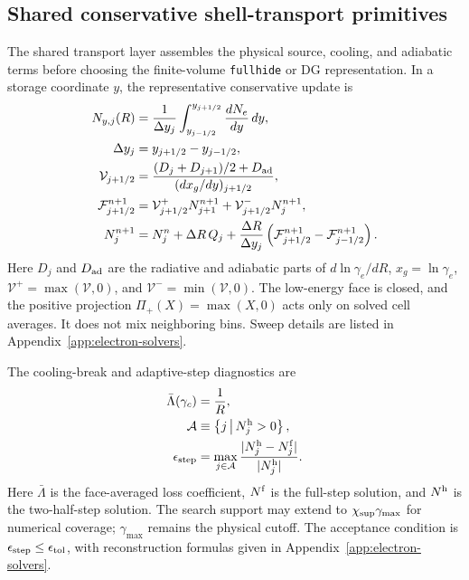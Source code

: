 \documentclass[twocolumn]{aastex702}
\begin{document}
\subsection{Shared conservative shell-transport primitives}

The shared transport layer assembles the physical source, cooling, and adiabatic
terms before choosing the finite-volume \texttt{fullhide} or DG representation.
In a storage coordinate \(y\), the representative conservative update is
\begin{equation}
\begin{aligned}
N_{y,j}(R)&=\frac{1}{\Delta y_j}
\int_{y_{j-1/2}}^{y_{j+1/2}}\frac{dN_e}{dy}\,dy,\\
\Delta y_j&=y_{j+1/2}-y_{j-1/2},\\
\mathcal{V}_{j+1/2}&=
\frac{(D_j+D_{j+1})/2+D_{\rm ad}}
{(dx_g/dy)_{j+1/2}},\\
\mathcal{F}_{j+1/2}^{n+1}&
=\mathcal{V}_{j+1/2}^{+}N_{j+1}^{n+1}
+\mathcal{V}_{j+1/2}^{-}N_j^{n+1},\\
N_j^{n+1}&=N_j^n+\Delta R\,Q_j
+\frac{\Delta R}{\Delta y_j}
\left(\mathcal{F}_{j+1/2}^{n+1}
-\mathcal{F}_{j-1/2}^{n+1}\right).
\end{aligned}
\end{equation}
Here \(D_j\) and \(D_{\rm ad}\) are the radiative and adiabatic parts of
\(d\ln\gamma_e/dR\), \(x_g=\ln\gamma_e\),
\(\mathcal{V}^{+}=\max(\mathcal{V},0)\), and
\(\mathcal{V}^{-}=\min(\mathcal{V},0)\).  The low-energy face is closed, and the
positive projection \(\Pi_+(X)=\max(X,0)\) acts only on solved cell averages.  It
does not mix neighboring bins.  Sweep details are listed in
Appendix~\ref{app:electron-solvers}.

The cooling-break and adaptive-step diagnostics are
\begin{equation}
\begin{aligned}
\bar{\Lambda}(\gamma_c)&=\frac{1}{R},
\\
\mathcal{A}&\equiv
\left\{j\,\middle|\,N^{\rm h}_j>0\right\},
\\
\epsilon_{\rm step}&=
\max_{j\in\mathcal{A}}
\frac{|N^{\rm h}_j-N^{\rm f}_j|}
{|N^{\rm h}_j|}.
\end{aligned}
\end{equation}
Here \(\bar{\Lambda}\) is the face-averaged loss coefficient, \(N^{\rm f}\) is
the full-step solution, and \(N^{\rm h}\) is the two-half-step solution.  The
search support may extend to \(\chi_{\rm sup}\gamma_{\max}\) for numerical
coverage; \(\gamma_{\max}\) remains the physical cutoff.  The acceptance
condition is \(\epsilon_{\rm step}\le\epsilon_{\rm tol}\), with reconstruction
formulas given in Appendix~\ref{app:electron-solvers}.
\end{document}
